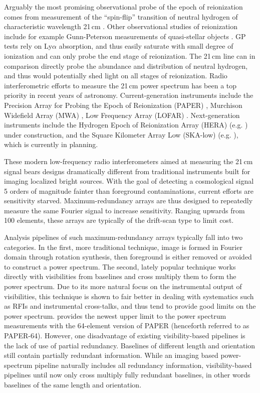 \documentclass[twocolumn,apj,numberedappendix]{emulateapj}
\renewcommand\[{\begin{equation}}
\renewcommand\]{\end{equation}}
\begin{document}
Arguably the most promising observational probe of the epoch of reionization
comes from measurement of the ``spin-flip'' transition of neutral
hydrogen of characteristic wavelength 21\,cm \citep{Furlanetto2006181,PritchardLoeb}.
Other observational studies of reionization include for example Gunn-Peterson measurements of quasi-stellar objects \citep{Fan2006}. GP tests rely on Ly$\alpha$ absorption, and thus easily saturate with small degree of ionization and can only probe the end stage of reionization. The 21\,cm line can in comparison directly probe the
abundance and distribution of neutral hydrogen, and thus would potentially
shed light on all stages of reionization. Radio interferometric efforts
to measure the 21\,cm power spectrum has been a top priority in recent years of astronomy.
Current-generation instruments include the Precision Array for Probing
the Epoch of Reionization (PAPER) \citep{Ali2015,paper32}, Murchison
Widefield Array (MWA) \citep{Bowman2013, Tingay2013}, Low Frequency Array (LOFAR) \citep{LOFAR}. Next-generation instruments include the Hydrogen Epoch of Reionization
Array (HERA) (e.g. \citealt{HERA,HERAconfiguration,HERABEAM1,HERADISH2})  under construction, 
and the Square Kilometer Array Low (SKA-low) (e.g. \citealt{SKA1}), which is currently in planning. 

These modern low-frequency radio interferometers aimed at measuring the 21\,cm signal bears designs dramatically different from traditional instruments built for imaging localized bright sources.  With the goal of detecting a cosmological signal 5 orders of magnitude fainter than foreground contaminations, current efforts are sensitivity starved. Maximum-redundancy arrays are thus designed to repeatedly measure the same Fourier signal to increase sensitivity. Ranging upwards from 100 elements, these arrays are typically of the drift-scan type to limit cost. 

Analysis pipelines of such maximum-redundancy arrays typically fall into two categories. In the first, more traditional technique, image is formed in Fourier domain through rotation synthesis, then foreground is either removed or avoided to construct a power spectrum. The second, lately popular technique works directly with visibilities from baselines and cross multiply them to form the power spectrum. Due to its more natural focus on the instrumental output of visibilities, this technique is shown to fair better in dealing with systematics such as RFIs and instrumental cross-talks, and thus tend to provide good limits on the power spectrum. \cite{Ali2015} provides the newest upper limit to the power spectrum
measurements with the 64-element version of PAPER (henceforth referred to as PAPER-64). However, one disadvantage of existing visibility-based pipelines is the lack of use of partial redundancy. Baselines of different length and orientation still contain partially redundant information. While an imaging based power-spectrum pipeline naturally includes all redundancy information, visibility-based pipelines until now only cross multiply fully redundant baselines, in other words baselines of the same length and orientation.
\end{document}
